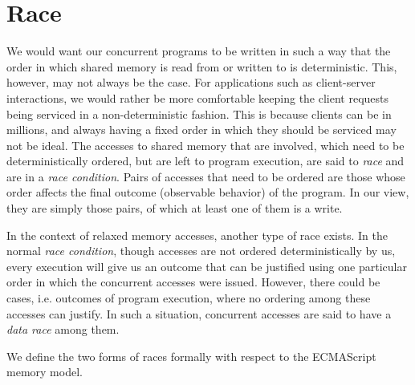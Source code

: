     \section{Race}

        We would want our concurrent programs to be written in such a way that the order in which shared memory is read from or written to is deterministic.
        This, however, may not always be the case. 
        For applications such as client-server interactions, we would rather be more comfortable keeping the client requests being serviced in a non-deterministic fashion. 
        This is because clients can be in millions, and always having a fixed order in which they should be serviced may not be ideal.
        The accesses to shared memory that are involved, which need to be deterministically ordered, but are left to program execution, are said to \textit{race} and are in a \textit{race condition}.
        Pairs of accesses that need to be ordered are those whose order affects the final outcome (observable behavior) of the program.
        In our view, they are simply those pairs, of which at least one of them is a write. 
        
        In the context of relaxed memory accesses, another type of race exists.
        In the normal \textit{race condition}, though accesses are not ordered deterministically by us, every execution will give us an outcome that can be justified using one particular order in which the concurrent accesses were issued. 
        However, there could be cases, i.e. outcomes of program execution, where no ordering among these accesses can justify\footnotemark.
        In such a situation, concurrent accesses are said to have a \textit{data race} among them.    
        

        We define the two forms of races formally with respect to the ECMAScript memory model.
        
